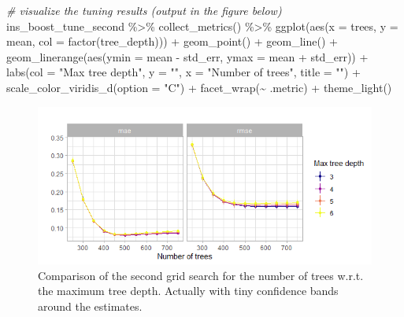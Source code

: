 \documentclass[
]{book}
\newenvironment{Shaded}{\begin{snugshade}}{\end{snugshade}}
\newcommand{\AttributeTok}[1]{\textcolor[rgb]{0.77,0.63,0.00}{#1}}
\newcommand{\CommentTok}[1]{\textcolor[rgb]{0.56,0.35,0.01}{\textit{#1}}}
\newcommand{\FunctionTok}[1]{\textcolor[rgb]{0.00,0.00,0.00}{#1}}
\newcommand{\NormalTok}[1]{#1}
\newcommand{\SpecialCharTok}[1]{\textcolor[rgb]{0.00,0.00,0.00}{#1}}
\newcommand{\StringTok}[1]{\textcolor[rgb]{0.31,0.60,0.02}{#1}}
\begin{document}
\begin{Shaded}
\begin{Highlighting}[]
\CommentTok{\# visualize the tuning results (output in the figure below)}
\NormalTok{ins\_boost\_tune\_second }\SpecialCharTok{\%\textgreater{}\%}
  \FunctionTok{collect\_metrics}\NormalTok{() }\SpecialCharTok{\%\textgreater{}\%}
  \FunctionTok{ggplot}\NormalTok{(}\FunctionTok{aes}\NormalTok{(}\AttributeTok{x =}\NormalTok{ trees, }\AttributeTok{y =}\NormalTok{ mean, }\AttributeTok{col =} \FunctionTok{factor}\NormalTok{(tree\_depth))) }\SpecialCharTok{+}
  \FunctionTok{geom\_point}\NormalTok{() }\SpecialCharTok{+}
  \FunctionTok{geom\_line}\NormalTok{() }\SpecialCharTok{+}
  \FunctionTok{geom\_linerange}\NormalTok{(}\FunctionTok{aes}\NormalTok{(}\AttributeTok{ymin =}\NormalTok{ mean }\SpecialCharTok{{-}}\NormalTok{ std\_err, }\AttributeTok{ymax =}\NormalTok{ mean }\SpecialCharTok{+}\NormalTok{ std\_err)) }\SpecialCharTok{+}
  \FunctionTok{labs}\NormalTok{(}\AttributeTok{col =} \StringTok{"Max tree depth"}\NormalTok{, }\AttributeTok{y =} \StringTok{""}\NormalTok{, }\AttributeTok{x =} \StringTok{"Number of trees"}\NormalTok{,}
       \AttributeTok{title =} \StringTok{""}\NormalTok{) }\SpecialCharTok{+}
  \FunctionTok{scale\_color\_viridis\_d}\NormalTok{(}\AttributeTok{option =} \StringTok{"C"}\NormalTok{) }\SpecialCharTok{+}
  \FunctionTok{facet\_wrap}\NormalTok{(}\SpecialCharTok{\textasciitilde{}}\NormalTok{ .metric) }\SpecialCharTok{+}
  \FunctionTok{theme\_light}\NormalTok{()}
\end{Highlighting}
\end{Shaded}

\begin{figure}

{\centering \includegraphics[width=0.7\linewidth]{_pictures/boost_ins_tune_plot2} 

}

\caption{Comparison of the second grid search for the number of trees w.r.t. the maximum tree depth. Actually with tiny confidence bands around the estimates.}\label{fig:boostInstuneplot2}
\end{figure}
\end{document}
